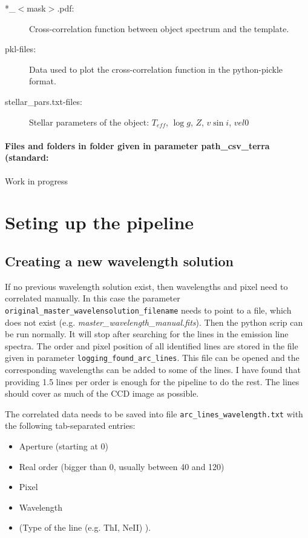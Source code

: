 \documentclass[10pt,a4paper]{article}
\begin{document}
\begin{description}
  \item[*\_$<$mask$>$.pdf:] Cross-correlation function between object spectrum and the template.
  \item[pkl-files:] Data used to plot the cross-correlation function in the python-pickle format.
  \item[stellar\_pars.txt-files:] Stellar parameters of the object: $T_{eff}$, $\log g$, $Z$, $v\sin i$, $vel0$
\end{description}

\paragraph{Files and folders in folder given in parameter path\_csv\_terra (standard: }
Work in progress

\newpage
\section{Seting up the pipeline}

\subsection{Creating a new wavelength solution}
\label{section:create_new_wave_solution}
If no previous wavelength solution exist, then wavelengths and pixel need to correlated manually. In this case the parameter \verb|original_master_wavelensolution_filename| needs to point to a file, which does not exist (e.g. \textit{master\_wavelength\_manual.fits}). Then the python scrip can be run normally. It will stop after searching for the lines in the emission line spectra. The order and pixel position of all identified lines are stored in the file given in parameter \verb|logging_found_arc_lines|. This file can be opened and the corresponding wavelengths can be added to some of the lines. I have found that providing 1.5 lines per order is enough for the pipeline to do the rest. The lines should cover as much of the CCD image as possible.

The correlated data needs to be saved into file \verb|arc_lines_wavelength.txt| with the following tab-separated entries:
\begin{itemize}
  \item Aperture (starting at 0)
  \item Real order (bigger than 0, usually between 40 and 120)
  \item Pixel
  \item Wavelength
  \item (Type of the line (e.g. ThI, NeII) ).
\end{itemize}
\end{document}
